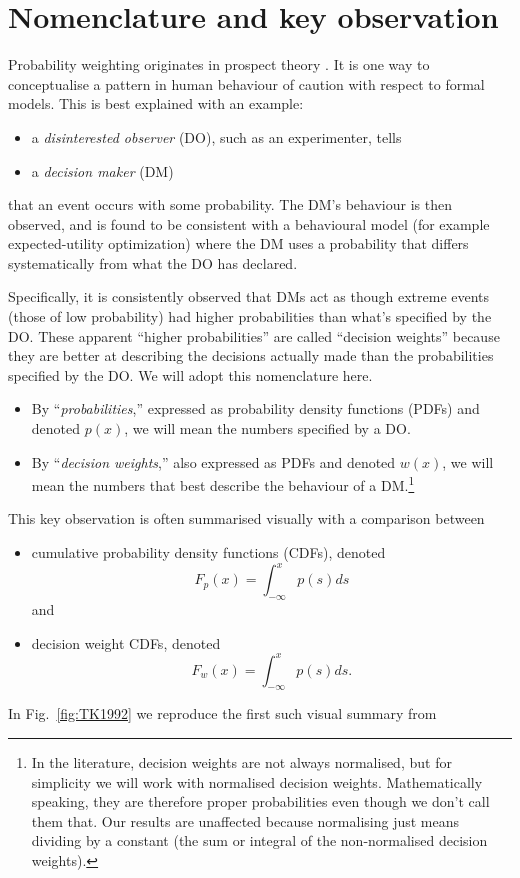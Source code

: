 \documentclass[11pt]{article}
\newcommand{\fref}[1]{Fig.~\ref{fig:#1}}
\newcommand{\be}{\begin{equation}}
\newcommand{\ee}{\end{equation}}
\newcommand{\bi}{\begin{itemize}}
\newcommand{\ei}{\end{itemize}}
\numberwithin{equation}{section}
\begin{document}
\section{Nomenclature and key observation}
Probability weighting originates in prospect theory  \citep{Barberis2013}. It is one way to conceptualise a pattern in human behaviour of caution with respect to formal models. This is best explained with an example:  
\bi
\item 
a {\it disinterested observer} (DO), such as an experimenter, tells
\item
a {\it decision maker} (DM) 
\ei
that an event occurs with some probability. The DM's behaviour is then observed, and is found to be consistent with a behavioural model (for example expected-utility optimization) where the DM uses a probability that differs systematically from what the DO has declared. 

Specifically, it is consistently observed that DMs act as though extreme events (those of low probability) had higher probabilities than what's specified by the DO. These apparent ``higher probabilities'' are called ``decision weights'' because they are better at describing the decisions actually made than the probabilities specified by the DO. We will adopt this nomenclature here. 
\bi
\item
By ``{\it probabilities},'' expressed as probability density functions (PDFs) and denoted $p(x)$, we will mean the numbers specified by a DO.
\item
By ``{\it decision weights},'' also expressed as PDFs and denoted $w(x)$, we will mean the numbers that best describe the behaviour of a DM.\footnote{In the literature, decision weights are not always normalised, but for simplicity we will work with normalised decision weights. Mathematically speaking, they are therefore proper probabilities even though we don't call them that. Our results are unaffected because normalising just means dividing by a constant (the sum or integral of the non-normalised decision weights).}
\ei

This key observation is often summarised visually with a comparison between 
\bi
\item
cumulative probability density functions (CDFs), denoted 
\be
F_p(x)=\int_{-\infty}^x p(s) ds
\ee
 and 
\item
decision weight CDFs, denoted
\be
F_w(x)=\int_{-\infty}^x p(s) ds.
\ee
\ei
In \fref{TK1992} we reproduce the first such visual summary from \citet{TverskyKahneman1992}
\end{document}

